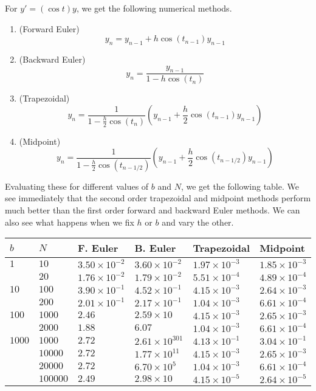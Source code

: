 \begin{solution}
  For $y' = (\cos t) y$, we get the following numerical methods.
  \begin{enumerate}
    \item (Forward Euler)
    \[
      y_n = y_{n-1} + h \cos(t_{n-1})y_{n-1}
    \]
    \item (Backward Euler)
    \[
      y_n = \frac{y_{n-1}}{1 - h \cos(t_n)}
    \]
    \item (Trapezoidal)
    \[
      y_n = \frac{1}{1 - \frac{h}{2}\cos(t_n)}\left(y_{n-1} + \frac{h}{2} \cos(t_{n-1}) y_{n-1}\right)
    \]
    \item (Midpoint)
    \[
      y_n = \frac{1}{1 - \frac{h}{2} \cos(t_{n-1/2})}\left(y_{n-1} + \frac{h}{2} \cos(t_{n-1/2}) y_{n-1}\right)
    \]
  \end{enumerate}
  Evaluating these for different values of $b$ and $N$, we get the following table. We see immediately that the second order trapezoidal and midpoint methods perform much better than the first order forward and backward Euler methods. We can also see what happens when we fix $h$ or $b$ and vary the other.
  
  \begin{table}[!ht]
    \centering
    \label{tab:main}
    \begin{tabular}{|llllll|}
      \hline
      $b$    & $N$      & F. Euler    & B. Euler       & Trapezoidal & Midpoint \\
      \hline
      $1$    & $10$     & $3.50 \times 10^{-2}$ & $3.60 \times 10^{-2}$   & $1.97 \times 10^{-3}$ & $1.85 \times 10^{-3}$ \\
             & $20$     & $1.76 \times 10^{-2}$ & $1.79 \times 10^{-2}$   & $5.51 \times 10^{-4}$ & $4.89 \times 10^{-4}$ \\
      $10$   & $100$    & $3.90 \times 10^{-1}$ & $4.52 \times 10^{-1}$   & $4.15 \times 10^{-3}$ & $2.64 \times 10^{-3}$ \\
             & $200$    & $2.01 \times 10^{-1}$ & $2.17 \times 10^{-1}$   & $1.04 \times 10^{-3}$ & $6.61 \times 10^{-4}$ \\
      $100$  & $1000$   & $2.46$                & $2.59 \times 10$        & $4.15 \times 10^{-3}$ & $2.65 \times 10^{-3}$ \\
             & $2000$   & $1.88$                & $6.07$                  & $1.04 \times 10^{-3}$ & $6.61 \times 10^{-4}$ \\
      $1000$ & $1000$   & $2.72$                & $2.61 \times 10^{301}$  & $4.13 \times 10^{-1}$ & $3.04 \times 10^{-1}$ \\
             & $10000$  & $2.72$                & $1.77 \times 10^{11}$   & $4.15 \times 10^{-3}$ & $2.65 \times 10^{-3}$ \\
             & $20000$  & $2.72$                & $6.70 \times 10^{5}$    & $1.04 \times 10^{-3}$ & $6.61 \times 10^{-4}$ \\
             & $100000$ & $2.49$                & $2.98 \times 10$        & $4.15 \times 10^{-5}$ & $2.64 \times 10^{-5}$ \\
      \hline
    \end{tabular}
  \end{table}
  

\end{solution}
